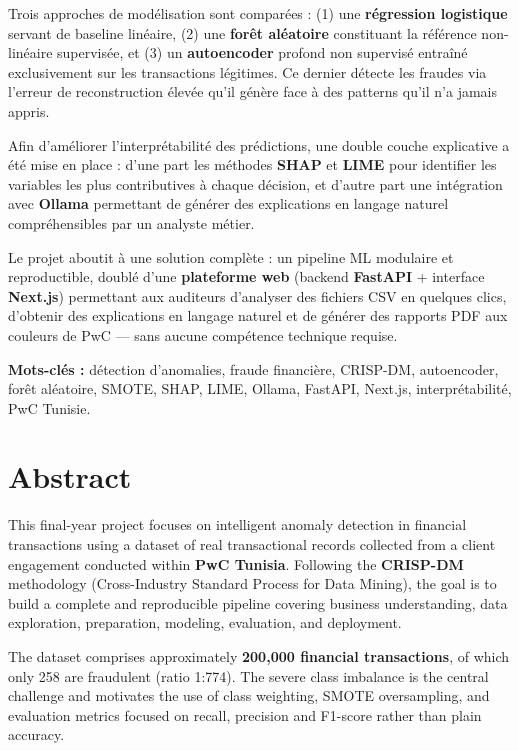 \documentclass[12pt,a4paper,twoside]{report}
\begin{document}
Trois approches de modélisation sont comparées : (1) une \textbf{régression logistique} servant de baseline linéaire, (2) une \textbf{forêt aléatoire} constituant la référence non-linéaire supervisée, et (3) un \textbf{autoencoder} profond non supervisé entraîné exclusivement sur les transactions légitimes. Ce dernier détecte les fraudes via l'erreur de reconstruction élevée qu'il génère face à des patterns qu'il n'a jamais appris.

Afin d'améliorer l'interprétabilité des prédictions, une double couche explicative a été mise en place : d'une part les méthodes \textbf{SHAP} et \textbf{LIME} pour identifier les variables les plus contributives à chaque décision, et d'autre part une intégration avec \textbf{Ollama} permettant de générer des explications en langage naturel compréhensibles par un analyste métier.

Le projet aboutit à une solution complète : un pipeline ML modulaire et reproductible, doublé d'une \textbf{plateforme web} (backend \textbf{FastAPI} + interface \textbf{Next.js}) permettant aux auditeurs d'analyser des fichiers CSV en quelques clics, d'obtenir des explications en langage naturel et de générer des rapports PDF aux couleurs de PwC — sans aucune compétence technique requise.

\vspace{0.5cm}
\textbf{Mots-clés :} détection d'anomalies, fraude financière, CRISP-DM, autoencoder, forêt aléatoire, SMOTE, SHAP, LIME, Ollama, FastAPI, Next.js, interprétabilité, PwC Tunisie.

\newpage

\chapter*{Abstract}

This final-year project focuses on intelligent anomaly detection in financial transactions using a dataset of real transactional records collected from a client engagement conducted within \textbf{PwC Tunisia}. Following the \textbf{CRISP-DM} methodology (Cross-Industry Standard Process for Data Mining), the goal is to build a complete and reproducible pipeline covering business understanding, data exploration, preparation, modeling, evaluation, and deployment.

The dataset comprises approximately \textbf{200,000 financial transactions}, of which only 258 are fraudulent (ratio 1:774). The severe class imbalance is the central challenge and motivates the use of class weighting, SMOTE oversampling, and evaluation metrics focused on recall, precision and F1-score rather than plain accuracy.
\end{document}

